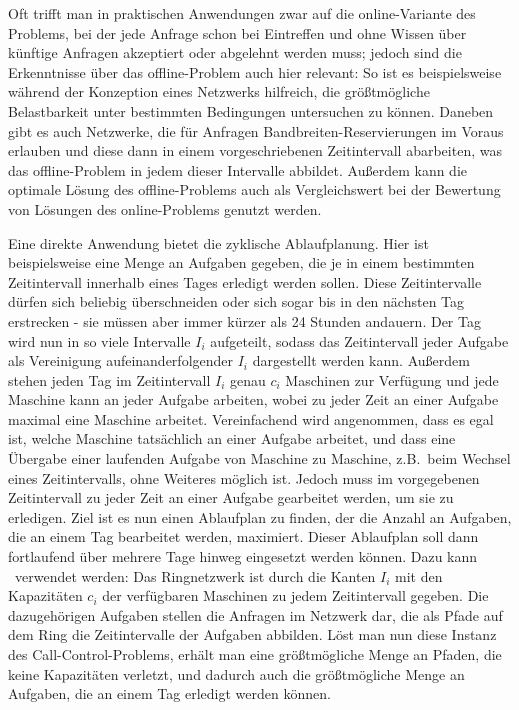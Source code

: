 Oft trifft man in praktischen Anwendungen zwar auf die online-Variante des Problems, bei der jede Anfrage schon bei Eintreffen und
ohne Wissen über künftige Anfragen akzeptiert oder abgelehnt werden muss;
jedoch sind die Erkenntnisse über das offline-Problem auch hier relevant:
So ist es beispielsweise während der Konzeption eines Netzwerks hilfreich, die größtmögliche Belastbarkeit unter bestimmten 
Bedingungen untersuchen zu können.
Daneben gibt es auch Netzwerke, die für Anfragen Bandbreiten-Reservierungen im Voraus erlauben und diese dann in einem 
vorgeschriebenen Zeitintervall abarbeiten, was das offline-Problem in jedem dieser Intervalle abbildet.
Außerdem kann die optimale Lösung des offline-Problems auch als Vergleichswert bei der Bewertung von Lösungen des
online-Problems genutzt werden.

Eine direkte Anwendung bietet die zyklische Ablaufplanung.
Hier ist beispielsweise eine Menge an Aufgaben gegeben, die je in einem bestimmten Zeitintervall innerhalb eines Tages erledigt werden sollen.
Diese Zeitintervalle dürfen sich beliebig überschneiden oder sich sogar bis in den nächsten Tag erstrecken - sie müssen aber immer kürzer 
als 24 Stunden andauern.
Der Tag wird nun in so viele Intervalle $I_i$ aufgeteilt, sodass das Zeitintervall jeder Aufgabe als Vereinigung  
aufeinanderfolgender $I_i$ dargestellt werden kann.
Außerdem stehen jeden Tag im Zeitintervall $I_i$ genau $c_i$ Maschinen zur Verfügung und jede Maschine kann an jeder Aufgabe arbeiten, wobei zu jeder
Zeit an einer Aufgabe maximal eine Maschine arbeitet.
Vereinfachend wird angenommen, dass es egal ist, welche Maschine tatsächlich an einer Aufgabe arbeitet, und dass eine Übergabe einer laufenden
Aufgabe von Maschine zu Maschine, z.B.\ beim Wechsel eines Zeitintervalls, ohne Weiteres möglich ist.
Jedoch muss im vorgegebenen Zeitintervall zu jeder Zeit an einer Aufgabe gearbeitet werden, um sie zu erledigen.
Ziel ist es nun einen Ablaufplan zu finden, der die Anzahl an Aufgaben, die an einem Tag bearbeitet werden, maximiert.
Dieser Ablaufplan soll dann fortlaufend über mehrere Tage hinweg eingesetzt werden können.
Dazu kann \CallControl\ verwendet werden: Das Ringnetzwerk ist durch die Kanten $I_i$ mit den Kapazitäten $c_i$ der verfügbaren Maschinen
zu jedem Zeitintervall gegeben. Die dazugehörigen Aufgaben stellen die Anfragen im Netzwerk dar, die als Pfade auf dem Ring die Zeitintervalle
der Aufgaben abbilden.
Löst man nun diese Instanz des Call-Control-Problems, erhält man eine größtmögliche Menge an Pfaden, die keine Kapazitäten verletzt, und dadurch auch die
größtmögliche Menge an Aufgaben, die an einem Tag erledigt werden können.
